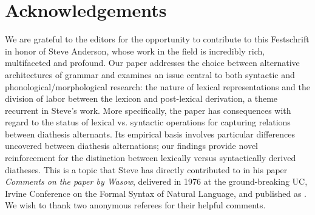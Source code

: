 \documentclass[output=paper,
modfonts
]{LSP/langsci}
\begin{document}
\section*{Acknowledgements}
We are grateful to the editors for the
  opportunity to contribute to this Festschrift in honor of Steve
  Anderson, whose work in the field is incredibly rich, multifaceted and
  profound. Our paper addresses the choice between alternative
  architectures of grammar and examines an issue central to both
  syntactic and phonological/morphological research: the nature of
  lexical representations and the division of labor between the lexicon
  and post-lexical derivation, a theme recurrent in Steve's work. More
  specifically, the paper has consequences with regard to the status of
  lexical vs. syntactic operations for capturing relations between
  diathesis alternants. Its empirical basis involves particular
  differences uncovered between diathesis alternations; our findings
  provide novel reinforcement for the distinction between lexically
  versus syntactically derived diatheses. This is a topic that Steve has
  directly contributed to in his paper \emph{Comments on the paper by
  Wasow}, delivered in 1976 at the ground-breaking UC, Irvine Conference
  on the Formal Syntax of Natural Language, and published as \citet{anderson1977}. We wish to thank two anonymous referees for their helpful
  comments.
  
  
\printbibliography[heading=subbibliography,notkeyword=this]
\end{document}
